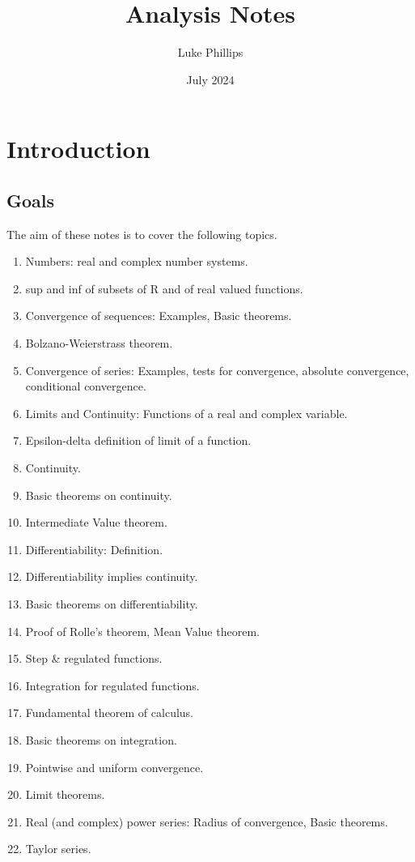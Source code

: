 \documentclass[10pt, a4paper]{article}
\title{Analysis Notes}
\author{Luke Phillips}
\date{July 2024}
\begin{document}
\maketitle

\newpage

\tableofcontents

\newpage

\section{Introduction}
\subsection{Goals}
The aim of these notes is to cover the following topics.
\begin{enumerate}
    \item Numbers: real and complex number systems.
    \item sup and inf of subsets of R and of real valued functions.
    \item Convergence of sequences: Examples, Basic theorems.
    \item Bolzano-Weierstrass theorem.
    \item Convergence of series: Examples, tests for convergence, absolute convergence, conditional convergence.
    \item Limits and Continuity: Functions of a real and complex variable.
    \item Epsilon-delta definition of limit of a function.
    \item Continuity.
    \item Basic theorems on continuity.
    \item Intermediate Value theorem.
    \item Differentiability: Definition.
    \item Differentiability implies continuity.
    \item Basic theorems on differentiability.
    \item Proof of Rolle's theorem, Mean Value theorem.
    \item Step \& regulated functions.
    \item Integration for regulated functions.
    \item Fundamental theorem of calculus.
    \item Basic theorems on integration.
    \item Pointwise and uniform convergence.
    \item Limit theorems.
    \item Real (and complex) power series: Radius of convergence, Basic theorems.
    \item Taylor series.
\end{enumerate}
\end{document}

